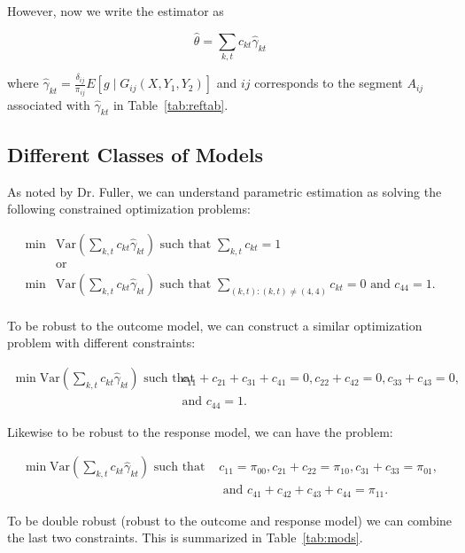 \documentclass[12pt]{article}
\newcommand{\Var}{{\text{Var}}}
\begin{document}
However, now we write the estimator as 

\[\hat \theta = \sum_{k,t} c_{kt}\hat \gamma_{kt}\]

where $\hat \gamma_{kt} = \frac{\delta_{ij}}{\pi_{ij}}E[g \mid G_{ij}(X, Y_1,
Y_2)]$ and $ij$ corresponds to the segment $A_{ij}$ associated with $\hat
\gamma_{kt}$ in Table~\ref{tab:reftab}.

\newpage

\subsection*{Different Classes of Models}

As noted by Dr. Fuller, we can understand parametric estimation as solving 
the following constrained optimization problems:

\begin{align*}
  \min &\Var\left(\sum_{k, t} c_{kt} \hat \gamma_{kt}\right) \text{ such that } 
  \sum_{k,t} c_{kt} = 1 \\
       &\text{or} \\
  \min &\Var\left(\sum_{k, t} c_{kt} \hat \gamma_{kt}\right) \text{ such that } 
  \sum_{(k,t): (k,t) \neq (4, 4)} c_{kt} = 0 \text{ and } c_{44} = 1. \\
\end{align*}

To be robust to the outcome model, we can construct a similar optimization
problem with different constraints:

\begin{align*}
  \min \Var\left(\sum_{k, t} c_{kt} \hat \gamma_{kt}\right) \text{ such that }& 
  c_{11} + c_{21} + c_{31} + c_{41} = 0, c_{22} + c_{42} = 0, c_{33} + c_{43} = 0,\\
       &\text{and } c_{44} = 1.
\end{align*}

Likewise to be robust to the response model, we can have the problem:

\begin{align*}
  \min \Var\left(\sum_{k, t} c_{kt} \hat \gamma_{kt}\right) \text{ such that }& 
  c_{11} = \pi_{00}, c_{21} + c_{22} = \pi_{10}, c_{31} + c_{33} = \pi_{01}, \\
       &\text{ and } c_{41} + c_{42} + c_{43} + c_{44} = \pi_{11}.
\end{align*}

To be double robust (robust to the outcome and response model) we can combine 
the last two constraints. This is summarized in Table~\ref{tab:mods}.
\end{document}
